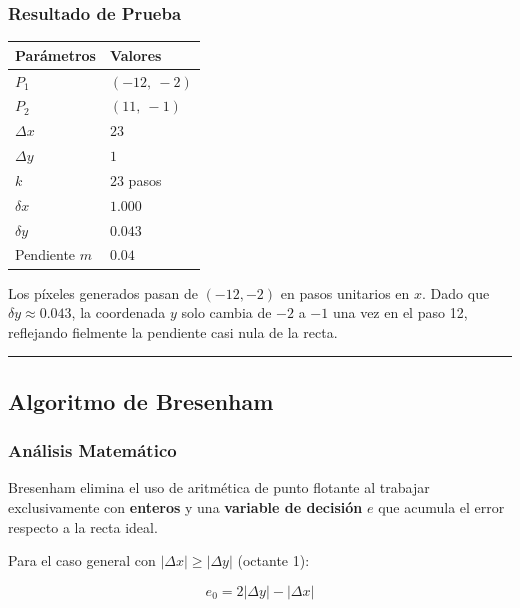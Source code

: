 \documentclass[
  spanish,
  a4paper,
  12pt,
]{article}
\newcounter{none} %
\begin{document}
\newpage

\subsubsection{Resultado de Prueba}\label{resultado-de-prueba}

{\def\LTcaptype{none} %
\begin{longtable}[]{@{}ll@{}}
\toprule\noalign{}
Parámetros & Valores \\
\midrule\noalign{}
\endhead
\bottomrule\noalign{}
\endlastfoot
\(P_1\) & \((-12,\ -2)\) \\
\(P_2\) & \((11,\ -1)\) \\
\(\Delta x\) & \(23\) \\
\(\Delta y\) & \(1\) \\
\(k\) & \(23\) pasos \\
\(\delta x\) & \(1.000\) \\
\(\delta y\) & \(0.043\) \\
Pendiente \(m\) & \(0.04\) \\
\end{longtable}
}

Los píxeles generados pasan de \((-12, -2)\) en pasos unitarios en
\(x\). Dado que \(\delta y \approx 0.043\), la coordenada \(y\) solo
cambia de \(-2\) a \(-1\) una vez en el paso 12, reflejando fielmente la
pendiente casi nula de la recta.

\begin{center}\rule{0.5\linewidth}{0.5pt}\end{center}

\subsection{Algoritmo de
Bresenham}\label{algoritmo-de-bresenham}

\subsubsection{Análisis
Matemático}\label{anuxe1lisis-matemuxe1tico-1}

Bresenham elimina el uso de aritmética de punto flotante al trabajar
exclusivamente con \textbf{enteros} y una \textbf{variable de decisión}
\(e\) que acumula el error respecto a la recta ideal.

Para el caso general con \(|\Delta x| \geq |\Delta y|\) (octante 1):

\[e_0 = 2|\Delta y| - |\Delta x|\]
\end{document}
